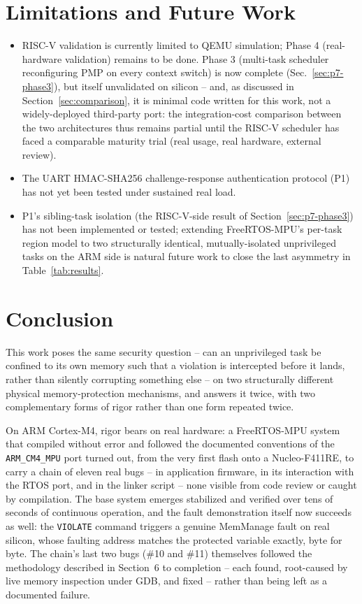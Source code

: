 \documentclass[sigconf,nonacm]{acmart}
\begin{document}
\section{Limitations and Future Work}

\begin{itemize}
  \item RISC-V validation is currently limited to QEMU simulation; Phase 4 (real-hardware validation) remains to be done. Phase 3 (multi-task scheduler reconfiguring PMP on every context switch) is now complete (Sec.~\ref{sec:p7-phase3}), but itself unvalidated on silicon -- and, as discussed in Section~\ref{sec:comparison}, it is minimal code written for this work, not a widely-deployed third-party port: the integration-cost comparison between the two architectures thus remains partial until the RISC-V scheduler has faced a comparable maturity trial (real usage, real hardware, external review).
  \item The UART HMAC-SHA256 challenge-response authentication protocol (P1) has not yet been tested under sustained real load.
  \item P1's sibling-task isolation (the RISC-V-side result of Section~\ref{sec:p7-phase3}) has not been implemented or tested; extending FreeRTOS-MPU's per-task region model to two structurally identical, mutually-isolated unprivileged tasks on the ARM side is natural future work to close the last asymmetry in Table~\ref{tab:results}.
\end{itemize}

\section{Conclusion}

This work poses the same security question -- can an unprivileged task be confined to its own memory such that a violation is intercepted before it lands, rather than silently corrupting something else -- on two structurally different physical memory-protection mechanisms, and answers it twice, with two complementary forms of rigor rather than one form repeated twice.

On ARM Cortex-M4, rigor bears on real hardware: a FreeRTOS-MPU system that compiled without error and followed the documented conventions of the \texttt{ARM\_CM4\_MPU} port turned out, from the very first flash onto a Nucleo-F411RE, to carry a chain of eleven real bugs -- in application firmware, in its interaction with the RTOS port, and in the linker script -- none visible from code review or caught by compilation. The base system emerges stabilized and verified over tens of seconds of continuous operation, and the fault demonstration itself now succeeds as well: the \texttt{VIOLATE} command triggers a genuine MemManage fault on real silicon, whose faulting address matches the protected variable exactly, byte for byte. The chain's last two bugs (\#10 and \#11) themselves followed the methodology described in Section~6 to completion -- each found, root-caused by live memory inspection under GDB, and fixed -- rather than being left as a documented failure.
\end{document}
